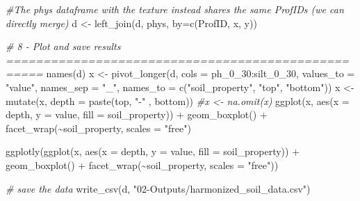 \documentclass[
  10pt,
  b5paper,
  oneside]{book}
\newenvironment{Shaded}{\begin{snugshade}}{\end{snugshade}}
\newcommand{\AttributeTok}[1]{\textcolor[rgb]{0.77,0.63,0.00}{#1}}
\newcommand{\CommentTok}[1]{\textcolor[rgb]{0.56,0.35,0.01}{\textit{#1}}}
\newcommand{\FunctionTok}[1]{\textcolor[rgb]{0.00,0.00,0.00}{#1}}
\newcommand{\NormalTok}[1]{#1}
\newcommand{\OtherTok}[1]{\textcolor[rgb]{0.56,0.35,0.01}{#1}}
\newcommand{\SpecialCharTok}[1]{\textcolor[rgb]{0.00,0.00,0.00}{#1}}
\newcommand{\StringTok}[1]{\textcolor[rgb]{0.31,0.60,0.02}{#1}}
\begin{document}
\begin{Shaded}
\begin{Highlighting}[]
\CommentTok{\#The phys dataframe with the texture instead shares the same ProfIDs (we can directly merge)}
\NormalTok{d }\OtherTok{\textless{}{-}} \FunctionTok{left\_join}\NormalTok{(d, phys, }\AttributeTok{by=}\FunctionTok{c}\NormalTok{(}\StringTok{\textquotesingle{}ProfID\textquotesingle{}}\NormalTok{, }\StringTok{\textquotesingle{}x\textquotesingle{}}\NormalTok{, }\StringTok{\textquotesingle{}y\textquotesingle{}}\NormalTok{))}

\CommentTok{\# 8 {-} Plot  and save results ===================================================}
\FunctionTok{names}\NormalTok{(d)}
\NormalTok{x }\OtherTok{\textless{}{-}} \FunctionTok{pivot\_longer}\NormalTok{(d, }\AttributeTok{cols =}\NormalTok{ ph\_0\_30}\SpecialCharTok{:}\NormalTok{silt\_0\_30, }\AttributeTok{values\_to =} \StringTok{"value"}\NormalTok{,}
                  \AttributeTok{names\_sep =} \StringTok{"\_"}\NormalTok{, }
                  \AttributeTok{names\_to =} \FunctionTok{c}\NormalTok{(}\StringTok{"soil\_property"}\NormalTok{, }\StringTok{"top"}\NormalTok{, }\StringTok{"bottom"}\NormalTok{))}
\NormalTok{x }\OtherTok{\textless{}{-}} \FunctionTok{mutate}\NormalTok{(x, }\AttributeTok{depth =} \FunctionTok{paste}\NormalTok{(top, }\StringTok{"{-}"}\NormalTok{ , bottom))}
\CommentTok{\#x \textless{}{-} na.omit(x)}
\FunctionTok{ggplot}\NormalTok{(x, }\FunctionTok{aes}\NormalTok{(}\AttributeTok{x =}\NormalTok{ depth, }\AttributeTok{y =}\NormalTok{ value, }\AttributeTok{fill =}\NormalTok{ soil\_property)) }\SpecialCharTok{+}
  \FunctionTok{geom\_boxplot}\NormalTok{() }\SpecialCharTok{+} 
  \FunctionTok{facet\_wrap}\NormalTok{(}\SpecialCharTok{\textasciitilde{}}\NormalTok{soil\_property, }\AttributeTok{scales =} \StringTok{"free"}\NormalTok{)}


\FunctionTok{ggplotly}\NormalTok{(}\FunctionTok{ggplot}\NormalTok{(x, }\FunctionTok{aes}\NormalTok{(}\AttributeTok{x =}\NormalTok{ depth, }\AttributeTok{y =}\NormalTok{ value, }\AttributeTok{fill =}\NormalTok{ soil\_property)) }\SpecialCharTok{+}
           \FunctionTok{geom\_boxplot}\NormalTok{() }\SpecialCharTok{+} 
           \FunctionTok{facet\_wrap}\NormalTok{(}\SpecialCharTok{\textasciitilde{}}\NormalTok{soil\_property, }\AttributeTok{scales =} \StringTok{"free"}\NormalTok{))}

\CommentTok{\# save the data}
\FunctionTok{write\_csv}\NormalTok{(d, }\StringTok{"02{-}Outputs/harmonized\_soil\_data.csv"}\NormalTok{)}
\end{Highlighting}
\end{Shaded}
\end{document}
